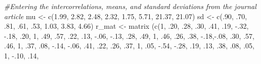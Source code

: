 \documentclass[
]{book}
\newenvironment{Shaded}{\begin{snugshade}}{\end{snugshade}}
\newcommand{\CommentTok}[1]{\textcolor[rgb]{0.56,0.35,0.01}{\textit{#1}}}
\newcommand{\DecValTok}[1]{\textcolor[rgb]{0.00,0.00,0.81}{#1}}
\newcommand{\FloatTok}[1]{\textcolor[rgb]{0.00,0.00,0.81}{#1}}
\newcommand{\FunctionTok}[1]{\textcolor[rgb]{0.00,0.00,0.00}{#1}}
\newcommand{\NormalTok}[1]{#1}
\newcommand{\OtherTok}[1]{\textcolor[rgb]{0.56,0.35,0.01}{#1}}
\newcommand{\SpecialCharTok}[1]{\textcolor[rgb]{0.00,0.00,0.00}{#1}}
\begin{document}
\begin{Shaded}
\begin{Highlighting}[]
\CommentTok{\#Entering the intercorrelations, means, and standard deviations from the journal article}
\NormalTok{mu }\OtherTok{\textless{}{-}} \FunctionTok{c}\NormalTok{(}\FloatTok{1.99}\NormalTok{, }\FloatTok{2.82}\NormalTok{, }\FloatTok{2.48}\NormalTok{, }\FloatTok{2.32}\NormalTok{, }\FloatTok{1.75}\NormalTok{, }\FloatTok{5.71}\NormalTok{, }\FloatTok{21.37}\NormalTok{, }\FloatTok{21.07}\NormalTok{)}
\NormalTok{sd }\OtherTok{\textless{}{-}} \FunctionTok{c}\NormalTok{(.}\DecValTok{90}\NormalTok{, .}\DecValTok{70}\NormalTok{, .}\DecValTok{81}\NormalTok{, .}\DecValTok{61}\NormalTok{, .}\DecValTok{53}\NormalTok{, }\FloatTok{1.03}\NormalTok{, }\FloatTok{3.83}\NormalTok{, }\FloatTok{4.66}\NormalTok{)}
\NormalTok{r\_mat }\OtherTok{\textless{}{-}} \FunctionTok{matrix}\NormalTok{ (}\FunctionTok{c}\NormalTok{(}\DecValTok{1}\NormalTok{, .}\DecValTok{20}\NormalTok{, .}\DecValTok{28}\NormalTok{, .}\DecValTok{30}\NormalTok{, .}\DecValTok{41}\NormalTok{, .}\DecValTok{19}\NormalTok{, }\SpecialCharTok{{-}}\NormalTok{.}\DecValTok{32}\NormalTok{, }\SpecialCharTok{{-}}\NormalTok{.}\DecValTok{18}\NormalTok{,}
\NormalTok{        .}\DecValTok{20}\NormalTok{, }\DecValTok{1}\NormalTok{, .}\DecValTok{49}\NormalTok{, .}\DecValTok{57}\NormalTok{, .}\DecValTok{22}\NormalTok{, .}\DecValTok{13}\NormalTok{, }\SpecialCharTok{{-}}\NormalTok{.}\DecValTok{06}\NormalTok{, }\SpecialCharTok{{-}}\NormalTok{.}\DecValTok{13}\NormalTok{,}
\NormalTok{        .}\DecValTok{28}\NormalTok{, .}\DecValTok{49}\NormalTok{, }\DecValTok{1}\NormalTok{, .}\DecValTok{46}\NormalTok{, .}\DecValTok{26}\NormalTok{, .}\DecValTok{38}\NormalTok{, }\SpecialCharTok{{-}}\NormalTok{.}\DecValTok{18}\NormalTok{,}\SpecialCharTok{{-}}\NormalTok{.}\DecValTok{08}\NormalTok{, }
\NormalTok{        .}\DecValTok{30}\NormalTok{, .}\DecValTok{57}\NormalTok{, .}\DecValTok{46}\NormalTok{,  }\DecValTok{1}\NormalTok{, .}\DecValTok{37}\NormalTok{, .}\DecValTok{08}\NormalTok{, }\SpecialCharTok{{-}}\NormalTok{.}\DecValTok{14}\NormalTok{, }\SpecialCharTok{{-}}\NormalTok{.}\DecValTok{06}\NormalTok{,}
\NormalTok{        .}\DecValTok{41}\NormalTok{, .}\DecValTok{22}\NormalTok{, .}\DecValTok{26}\NormalTok{, .}\DecValTok{37}\NormalTok{, }\DecValTok{1}\NormalTok{, .}\DecValTok{05}\NormalTok{, }\SpecialCharTok{{-}}\NormalTok{.}\DecValTok{54}\NormalTok{, }\SpecialCharTok{{-}}\NormalTok{.}\DecValTok{28}\NormalTok{, }
\NormalTok{        .}\DecValTok{19}\NormalTok{, .}\DecValTok{13}\NormalTok{, .}\DecValTok{38}\NormalTok{, .}\DecValTok{08}\NormalTok{, .}\DecValTok{05}\NormalTok{, }\DecValTok{1}\NormalTok{, }\SpecialCharTok{{-}}\NormalTok{.}\DecValTok{10}\NormalTok{, .}\DecValTok{14}\NormalTok{, }

\end{Highlighting}
\end{Shaded}
\end{document}
